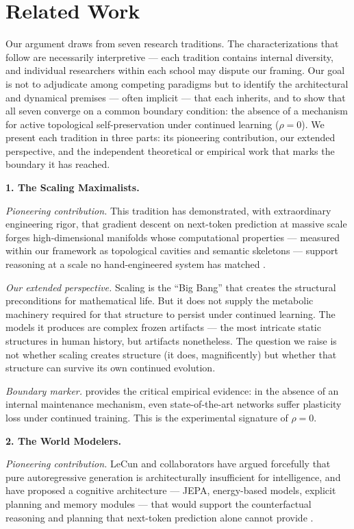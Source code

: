 \documentclass{article}
\begin{document}
\section{Related Work}
\label{sec:related}

Our argument draws from seven research traditions. The characterizations that follow are necessarily interpretive — each tradition contains internal diversity, and individual researchers within each school may dispute our framing. Our goal is not to adjudicate among competing paradigms but to identify the architectural and dynamical premises — often implicit — that each inherits, and to show that all seven converge on a common boundary condition: the absence of a mechanism for active topological self-preservation under continued learning ($\rho = 0$). We present each tradition in three parts: its pioneering contribution, our extended perspective, and the independent theoretical or empirical work that marks the boundary it has reached.

\bigskip
\noindent\textbf{1. The Scaling Maximalists.}

\emph{Pioneering contribution.} This tradition has demonstrated, with extraordinary engineering rigor, that gradient descent on next-token prediction at massive scale forges high-dimensional manifolds whose computational properties — measured within our framework as topological cavities and semantic skeletons — support reasoning at a scale no hand-engineered system has matched \citep{Sutton2019bitter,Kaplan2020scaling,Hoffmann2022chinchilla}.

\emph{Our extended perspective.} Scaling is the ``Big Bang'' that creates the structural preconditions for mathematical life. But it does not supply the metabolic machinery required for that structure to persist under continued learning. The models it produces are complex frozen artifacts — the most intricate static structures in human history, but artifacts nonetheless. The question we raise is not whether scaling creates structure (it does, magnificently) but whether that structure can survive its own continued evolution.

\emph{Boundary marker.} \citet{Dohare2024plasticity} provides the critical empirical evidence: in the absence of an internal maintenance mechanism, even state-of-the-art networks suffer plasticity loss under continued training. This is the experimental signature of $\rho = 0$.

\bigskip
\noindent\textbf{2. The World Modelers.}

\emph{Pioneering contribution.} LeCun and collaborators have argued forcefully that pure autoregressive generation is architecturally insufficient for intelligence, and have proposed a cognitive architecture — JEPA, energy-based models, explicit planning and memory modules — that would support the counterfactual reasoning and planning that next-token prediction alone cannot provide \citep{LeCun2022autonomous,LeCun2006energy}.
\end{document}
